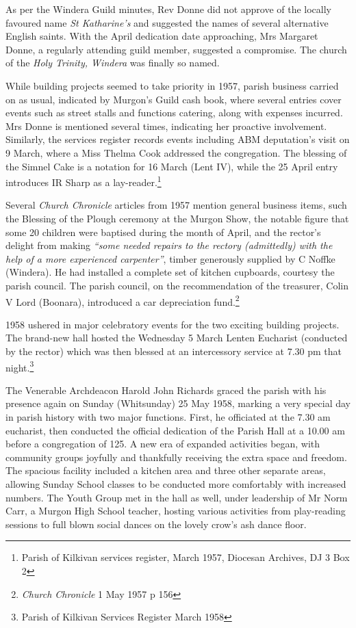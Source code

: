 As per the Windera Guild minutes, Rev Donne did not approve of the locally favoured name \emph{St Katharine's} and suggested the names of several alternative English saints. With the April dedication date approaching, Mrs Margaret Donne, a regularly attending guild member, suggested a compromise. The church of the \emph{Holy Trinity, Windera} was finally so named.



While building projects seemed to take priority in 1957, parish business carried on as usual, indicated by Murgon's Guild cash book, where several entries cover events such as street stalls and functions catering, along with expenses incurred. Mrs Donne is mentioned several times, indicating her proactive involvement. Similarly, the services register records events including ABM deputation's visit on 9 March, where a Miss Thelma Cook addressed the congregation. The blessing of the Simnel Cake is a notation for 16 March (Lent IV), while the 25 April entry introduces IR Sharp as a lay-reader.\footnote{Parish of Kilkivan services register, March 1957, Diocesan Archives, DJ 3 Box 2}


Several \emph{Church Chronicle} articles from 1957 mention general business items, such the Blessing of the Plough ceremony at the Murgon Show, the notable figure that some 20 children were baptised during the month of April, and the rector's delight from making \emph{``some needed repairs to the rectory (admittedly) with the help of a more experienced carpenter''}, timber generously supplied by C Noffke (Windera). He had installed a complete set of kitchen cupboards, courtesy the parish council. The parish council, on the recommendation of the treasurer, Colin V Lord (Boonara), introduced a car depreciation fund.\footnote{\emph{Church Chronicle} 1 May 1957 p 156}


1958 ushered in major celebratory events for the two exciting building projects. The brand-new hall hosted the Wednesday 5 March Lenten Eucharist (conducted by the rector) which was then blessed at an intercessory service at 7.30 pm that night.\footnote{Parish of Kilkivan Services Register March 1958}


The Venerable Archdeacon Harold John Richards graced the parish with his presence again on Sunday (Whitsunday) 25 May 1958, marking a very special day in parish history with two major functions. First, he officiated at the 7.30 am eucharist, then conducted the official dedication of the Parish Hall at a 10.00 am before a congregation of 125. A new era of expanded activities began, with community groups joyfully and thankfully receiving the extra space and freedom. The spacious facility included a kitchen area and three other separate areas, allowing Sunday School classes to be conducted more comfortably with increased numbers. The Youth Group met in the hall as well, under leadership of Mr Norm Carr, a Murgon High School teacher, hosting various activities from play-reading sessions to full blown social dances on the lovely crow's ash dance floor.



